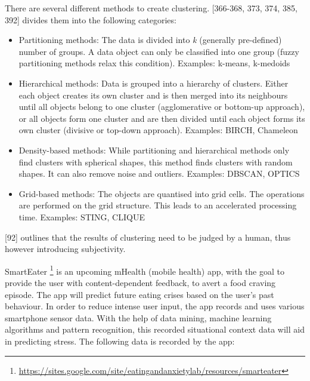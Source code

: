 \documentclass[12pt,a4paper]{article}
\begin{document}
There are several different methods to create clustering. \textcite{han2011data}[366-368, 373, 374, 385, 392]  divides them into the following categories:
\begin{itemize}
	\item Partitioning methods: The data is divided into \textit{k} (generally pre-defined) number of groups. A data object can only be classified into one group (fuzzy partitioning methods relax this condition). Examples: k-means, k-medoids
	\item Hierarchical methods: Data is grouped into a hierarchy of clusters. Either each object creates its own cluster and is then merged into its neighbours until all objects belong to one cluster (agglomerative or bottom-up approach), or all objects form one cluster and are then divided until each object forms its own cluster (divisive or top-down approach). Examples: BIRCH, Chameleon
	\item Density-based methods: While partitioning and hierarchical methods only find clusters with spherical shapes, this method finds clusters with random shapes. It can also remove noise and outliers. Examples: DBSCAN, OPTICS
	\item Grid-based methods: The objects are quantised into grid cells. The operations are performed on the grid structure. This leads to an accelerated processing time. Examples: STING, CLIQUE
\end{itemize}
\textcite{feldman2007text}[92] outlines that the results of clustering need to be judged by a human, thus however introducing subjectivity.

SmartEater \footnote{\url{https://sites.google.com/site/eatingandanxietylab/resources/smarteater}} is an upcoming mHealth (mobile health) app, with the goal to provide the user with content-dependent feedback, to avert a food craving episode. The app will predict future eating crises based on the user's past behaviour. In order to reduce intense user input, the app records and uses various smartphone sensor data.  With the help of data mining, machine learning algorithms and pattern recognition, this recorded situational context data will aid in predicting stress. The following data is recorded by the app:
\end{document}
